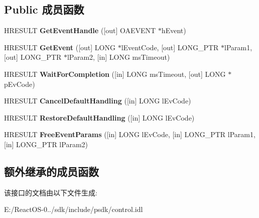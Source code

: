 \subsection*{Public 成员函数}
\begin{DoxyCompactItemize}
\item 
\mbox{\label{interface_quartz_type_lib_1_1_i_media_event_a6c0c2adf9aec835743183553333fdeb6}} 
H\+R\+E\+S\+U\+LT {\bfseries Get\+Event\+Handle} (\mbox{[}out\mbox{]} O\+A\+E\+V\+E\+NT $\ast$h\+Event)
\item 
\mbox{\label{interface_quartz_type_lib_1_1_i_media_event_a69b89bcef537008e2538a8fb9e5cb561}} 
H\+R\+E\+S\+U\+LT {\bfseries Get\+Event} (\mbox{[}out\mbox{]} L\+O\+NG $\ast$l\+Event\+Code, \mbox{[}out\mbox{]} L\+O\+N\+G\+\_\+\+P\+TR $\ast$l\+Param1, \mbox{[}out\mbox{]} L\+O\+N\+G\+\_\+\+P\+TR $\ast$l\+Param2, \mbox{[}in\mbox{]} L\+O\+NG ms\+Timeout)
\item 
\mbox{\label{interface_quartz_type_lib_1_1_i_media_event_af141d53a06b33dbcf72c09f57de2447d}} 
H\+R\+E\+S\+U\+LT {\bfseries Wait\+For\+Completion} (\mbox{[}in\mbox{]} L\+O\+NG ms\+Timeout, \mbox{[}out\mbox{]} L\+O\+NG $\ast$p\+Ev\+Code)
\item 
\mbox{\label{interface_quartz_type_lib_1_1_i_media_event_a70cc0c176115872dbe664d03c97a8810}} 
H\+R\+E\+S\+U\+LT {\bfseries Cancel\+Default\+Handling} (\mbox{[}in\mbox{]} L\+O\+NG l\+Ev\+Code)
\item 
\mbox{\label{interface_quartz_type_lib_1_1_i_media_event_ad03c3698c42ee01fd12da2f8c064fdda}} 
H\+R\+E\+S\+U\+LT {\bfseries Restore\+Default\+Handling} (\mbox{[}in\mbox{]} L\+O\+NG l\+Ev\+Code)
\item 
\mbox{\label{interface_quartz_type_lib_1_1_i_media_event_aa25fdb21523ed8dbd033660ec1dc2dcd}} 
H\+R\+E\+S\+U\+LT {\bfseries Free\+Event\+Params} (\mbox{[}in\mbox{]} L\+O\+NG l\+Ev\+Code, \mbox{[}in\mbox{]} L\+O\+N\+G\+\_\+\+P\+TR l\+Param1, \mbox{[}in\mbox{]} L\+O\+N\+G\+\_\+\+P\+TR l\+Param2)
\end{DoxyCompactItemize}
\subsection*{额外继承的成员函数}


该接口的文档由以下文件生成\+:\begin{DoxyCompactItemize}
\item 
E\+:/\+React\+O\+S-\/0../sdk/include/psdk/control.\+idl\end{DoxyCompactItemize}
